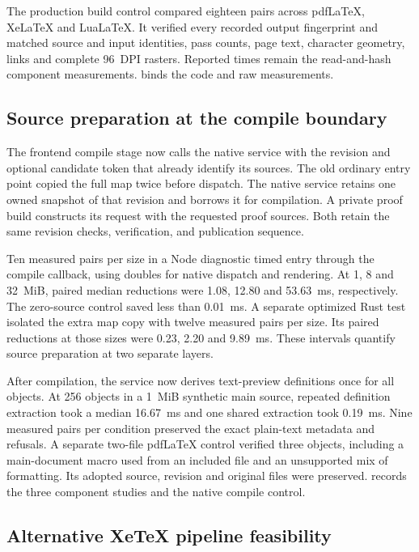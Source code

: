 The production build control compared eighteen pairs across pdf\LaTeX{},
Xe\LaTeX{} and Lua\LaTeX{}. It verified every recorded output fingerprint
and matched source and input identities, pass counts, page text, character
geometry, links and complete 96~DPI rasters. Reported times remain the
read-and-hash component measurements.
binds the code and raw measurements.


\subsection{Source preparation at the compile boundary}

The frontend compile stage now calls the native service with the
revision and optional candidate token that already identify its sources.
The old ordinary entry point copied the full map twice before dispatch.
The native service retains one owned snapshot of that revision and borrows
it for compilation. A private proof build constructs its request with the
requested proof sources. Both retain the same revision checks, verification,
and publication sequence.

Ten measured pairs per size in a Node diagnostic timed entry through the
compile callback, using doubles for native dispatch and rendering. At
1, 8 and 32~MiB, paired median reductions were 1.08, 12.80 and 53.63~ms,
respectively. The zero-source control saved less than 0.01~ms. A separate
optimized Rust test isolated the extra map copy with twelve measured
pairs per size. Its paired reductions at those sizes were 0.23, 2.20 and
9.89~ms. These intervals quantify source preparation at two separate layers.

After compilation, the service now derives text-preview definitions once
for all objects. At 256 objects in a 1~MiB synthetic main source, repeated
definition extraction took a median 16.67~ms and one shared extraction
took 0.19~ms. Nine measured pairs per condition preserved the exact
plain-text metadata and refusals. A separate two-file pdf\LaTeX{} control
verified three objects, including a main-document macro used from an
included file and an unsupported mix of formatting. Its adopted source,
revision and original files were preserved.
 records
the three component studies and the native compile control.

\subsection{Alternative XeTeX pipeline feasibility}

